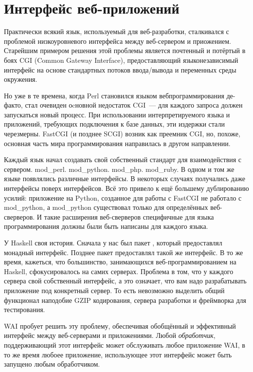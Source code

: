 \chapter{Интерфейс веб-приложений}\label{chap:web_application_interface}

Практически всякий язык, используемый для веб-разработки, сталкивался с проблемой
низкоуровневого интерфейса между веб-сервером и приожением. Старейшим примером
решения этой проблемы является почтенный и потёртый в боях CGI (Common Gateway Interface), 
предоставляющий языконезависимый интерфейс на основе стандартных потоков ввода/вывода и переменных среды окружения.

Но уже в те времена, когда Perl становился языком вебпрограммирования де-факто, стал очевиден оcновной недостаток CGI~--- для каждого запроса должен запускаться новый процесс.
При использовании интерпретируемого языка и приложений, требующих подключения к базе
данных, эти издержки стали черезмерны. FastCGI (и позднее SCGI) возник как преемник
CGI, но, похоже, основная часть мира программирования направилась в другом направлении.

Каждый язык начал создавать свой собственный стандарт для взаимодействия с сервером.
mod\_perl. mod\_python. mod\_php. mod\_ruby. В одном и том же языке появлялись различные
интерфейсы. В некоторых случаях получались даже интерфейсы поверх интерфейсов.
Всё это привело к ещё большему дублированию усилий: приложение на Python, созданное
для работы с FastCGI не работало с mod\_python, а mod\_python существовал только для
определённых веб-сверверов. И такие расширения веб-сверверов специфичные для языка программирования должны были быть написаны для каждого языка.

У Haskell своя история. Сначала у нас был пакет , 
который предоставлял монадный интерфейс. Позднее пакет 
предоставлял такой же интерфейс. В то же время, кажеться, что большинство,
занимающихся веб-программированием на Haskell, сфокусировалось на самих серверах.
Проблема в том, что у каждого сервера свой собственный интерфейс, а это означает, что 
вам надо разрабатывать приложение под конкретный сервер. То есть невозможно выделить
общий функционал наподобие GZIP кодирования, сервера разработки и фреймворка для тестирования.

WAI пробует решить эту проблему, обеспечивая обобщённый и эффективный интерфейс между
веб-серверами и приложениями. Любой \emph{обработчик}, поддерживающий этот интерфейс может обслуживать
любое приложение WAI, в то же время любоее приложение, использующее этот интерфейс может быть запущено любым обработчиком.

